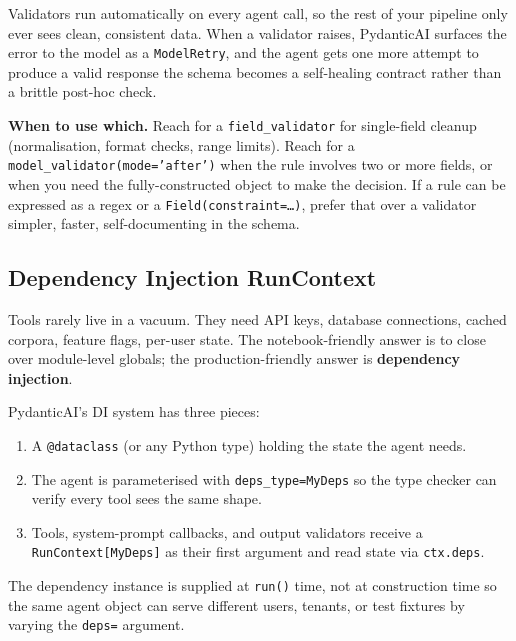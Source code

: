 \documentclass[a4paper,11pt]{article}
\begin{document}
Validators run automatically on every agent call, so the rest of
your pipeline only ever sees clean, consistent data. When a
validator raises, PydanticAI surfaces the error to the model as a
\texttt{ModelRetry}, and the agent gets one more attempt to produce
a valid response \textemdash{} the schema becomes a self-healing
contract rather than a brittle post-hoc check.

\begin{ambercallout}
\textbf{When to use which.}
Reach for a \texttt{field\_validator} for single-field cleanup
(normalisation, format checks, range limits). Reach for a
\texttt{model\_validator(mode='after')} when the rule involves two
or more fields, or when you need the fully-constructed object to
make the decision. If a rule can be expressed as a regex or a
\texttt{Field(constraint=\ldots{})}, prefer that over a validator
\textemdash{} simpler, faster, self-documenting in the schema.
\end{ambercallout}

\subsection{Dependency Injection \textemdash{} RunContext}

Tools rarely live in a vacuum. They need API keys, database
connections, cached corpora, feature flags, per-user state. The
notebook-friendly answer is to close over module-level globals; the
production-friendly answer is \textbf{dependency injection}.

PydanticAI's DI system has three pieces:

\begin{enumerate}[noitemsep, leftmargin=1.4em]
  \item A \texttt{@dataclass} (or any Python type) holding the
        state the agent needs.
  \item The agent is parameterised with \texttt{deps\_type=MyDeps}
        so the type checker can verify every tool sees the same
        shape.
  \item Tools, system-prompt callbacks, and output validators
        receive a \texttt{RunContext[MyDeps]} as their first
        argument and read state via \texttt{ctx.deps}.
\end{enumerate}

The dependency instance is supplied at \texttt{run()} time, not at
construction time \textemdash{} so the same agent object can serve
different users, tenants, or test fixtures by varying the
\texttt{deps=} argument.
\end{document}
